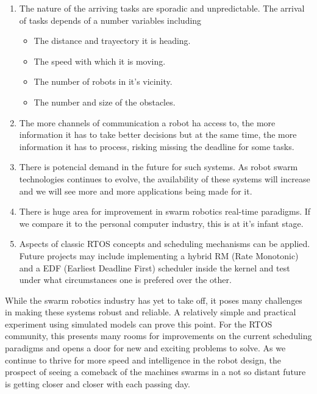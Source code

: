 \documentclass[journal]{IEEEtran}
\begin{document}
\begin{itemize}
\begin{enumerate}
\item The nature of the arriving tasks are sporadic and unpredictable. The arrival of tasks depends of a number variables including

\begin{itemize}
\item The distance and trayectory it is heading.
\item The speed with which it is moving.
\item The number of robots in it's vicinity.
\item The number and size of the obstacles.
\end{itemize}

\item The more channels of communication a robot ha access to, the more information it has to take better decisions but at the same time, the more information it has to process, risking missing the deadline for some tasks.

\item There is potencial demand in the future for such systems. As robot swarm technologies continues to evolve, the availability of these systems will increase and we will see more and more applications being made for it.

\item There is huge area for improvement in swarm robotics real-time paradigms. If we compare it to the personal computer industry, this is at it's infant stage.

\item Aspects of classic RTOS concepts and scheduling mechanisms can be applied. Future projects may include implementing a hybrid RM (Rate Monotonic) and a EDF (Earliest Deadline First) scheduler inside the kernel and test under what circumstances one is prefered over the other.

\end{enumerate}

While the swarm robotics industry has yet to take off, it poses many challenges in making these systems robust and reliable. A relatively simple and practical experiment using simulated models can prove this point.
For the RTOS community, this presents many rooms for improvements on the current scheduling paradigms and opens a door for new and exciting problems to solve. As we continue to thrive for more speed and intelligence in the robot design, the prospect of seeing a comeback of the machines swarms in a not so distant future is getting closer and closer with each passing day.


\end{itemize}
\end{document}
